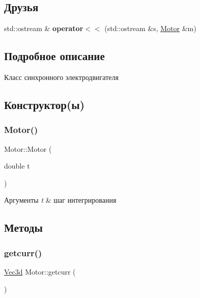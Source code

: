 \subsection*{Друзья}
\begin{DoxyCompactItemize}
\item 
\mbox{\label{classMotor_a6de8620f6da17a10dd96a51dad28b54f}} 
std\+::ostream \& {\bfseries operator$<$$<$} (std\+::ostream \&s, \hyperlink{classMotor}{Motor} \&m)
\end{DoxyCompactItemize}


\subsection{Подробное описание}
Класс синхронного электродвигателя 

\subsection{Конструктор(ы)}
\mbox{\label{classMotor_a060931682af482a7f7b1169304cbcd52}} 
\subsubsection{\texorpdfstring{Motor()}{Motor()}}
{\footnotesize\ttfamily Motor\+::\+Motor (\begin{DoxyParamCaption}\item[{double}]{t }\end{DoxyParamCaption})\hspace{0.3cm}{\ttfamily [inline]}}


\begin{DoxyParams}{Аргументы}
{\em t} & шаг интегрирования \\
\hline
\end{DoxyParams}


\subsection{Методы}
\mbox{\label{classMotor_a519cb1cf6fd48ce81f718eb340bbe9df}} 
\subsubsection{\texorpdfstring{getcurr()}{getcurr()}}
{\footnotesize\ttfamily \hyperlink{structVec3}{Vec3d} Motor\+::getcurr (\begin{DoxyParamCaption}{ }\end{DoxyParamCaption})\hspace{0.3cm}{\ttfamily [inline]}}

